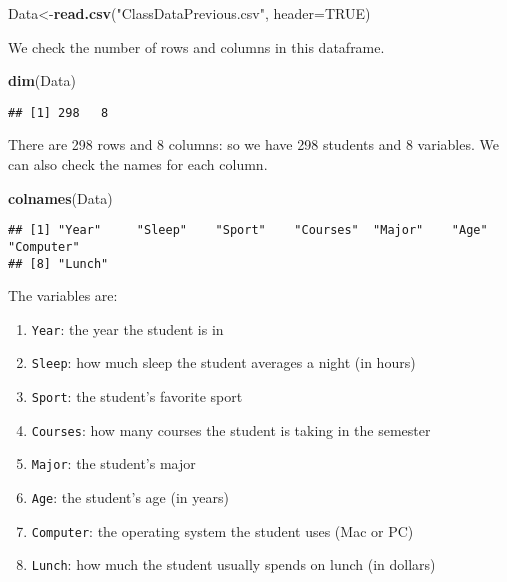 \documentclass[
]{book}
\newenvironment{Shaded}{\begin{snugshade}}{\end{snugshade}}
\newcommand{\AttributeTok}[1]{\textcolor[rgb]{0.13,0.29,0.53}{#1}}
\newcommand{\ConstantTok}[1]{\textcolor[rgb]{0.56,0.35,0.01}{#1}}
\newcommand{\FunctionTok}[1]{\textcolor[rgb]{0.13,0.29,0.53}{\textbf{#1}}}
\newcommand{\NormalTok}[1]{#1}
\newcommand{\OtherTok}[1]{\textcolor[rgb]{0.56,0.35,0.01}{#1}}
\newcommand{\StringTok}[1]{\textcolor[rgb]{0.31,0.60,0.02}{#1}}
\providecommand{\tightlist}{%
  \setlength{\itemsep}{0pt}\setlength{\parskip}{0pt}}
\begin{document}
\begin{Shaded}
\begin{Highlighting}[]
\NormalTok{Data}\OtherTok{\textless{}{-}}\FunctionTok{read.csv}\NormalTok{(}\StringTok{"ClassDataPrevious.csv"}\NormalTok{, }\AttributeTok{header=}\ConstantTok{TRUE}\NormalTok{)}
\end{Highlighting}
\end{Shaded}

We check the number of rows and columns in this dataframe.

\begin{Shaded}
\begin{Highlighting}[]
\FunctionTok{dim}\NormalTok{(Data)}
\end{Highlighting}
\end{Shaded}

\begin{verbatim}
## [1] 298   8
\end{verbatim}

There are 298 rows and 8 columns: so we have 298 students and 8 variables. We can also check the names for each column.

\begin{Shaded}
\begin{Highlighting}[]
\FunctionTok{colnames}\NormalTok{(Data)}
\end{Highlighting}
\end{Shaded}

\begin{verbatim}
## [1] "Year"     "Sleep"    "Sport"    "Courses"  "Major"    "Age"      "Computer"
## [8] "Lunch"
\end{verbatim}

The variables are:

\begin{enumerate}
\def\labelenumi{\arabic{enumi}.}
\tightlist
\item
  \texttt{Year}: the year the student is in
\item
  \texttt{Sleep}: how much sleep the student averages a night (in hours)
\item
  \texttt{Sport}: the student's favorite sport
\item
  \texttt{Courses}: how many courses the student is taking in the semester
\item
  \texttt{Major}: the student's major
\item
  \texttt{Age}: the student's age (in years)
\item
  \texttt{Computer}: the operating system the student uses (Mac or PC)
\item
  \texttt{Lunch}: how much the student usually spends on lunch (in dollars)
\end{enumerate}
\end{document}
